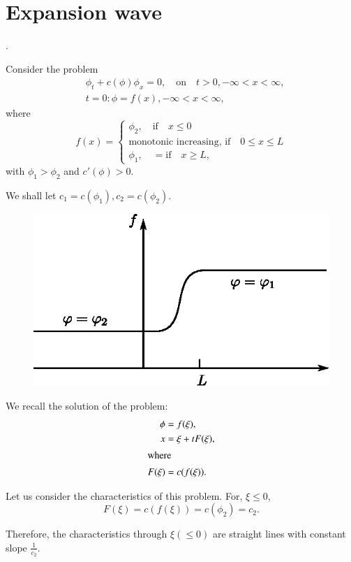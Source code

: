 \section{Expansion wave}.\label{chap1:sec1.3}

Consider the problem
\begin{align*}
&\phi_t+c(\phi)\phi_x=0,\quad\text{on}\quad t>0, -\infty < x < \infty,\\
& t=0:\phi =f(x), -\infty < x< \infty,
\end{align*}
where
\begin{equation*}
f(x)=
\begin{cases}
\phi_2, \quad\text{if}\quad x\leq 0\\
\text{monotonic increasing, if}\quad 0\leq x\leq L\\
\phi_1,\quad=\text{if}\quad x\geq L,
\end{cases}
\end{equation*}
with $\phi_1>\phi_2$ and $c'(\phi)>0$.

We shall let $c_1=c(\phi_1), c_2=c(\phi_2)$.
\begin{figure}[H]
\centering
\includegraphics{figures/fig61-1.2.eps}
\caption{}
\label{chap1:fig1.2}
\end{figure}\pageoriginale

We recall the solution of the problem:
\begin{align*}
\phi &= f(\xi),\\
x&=\xi + tF(\xi),\\
\intertext{where}
F(\xi) &= c(f(\xi)).
\end{align*}

Let us consider the characteristics of this problem. For, $\xi\leq 0$,
$$
F(\xi)=c(f(\xi))=c(\phi_2)=c_2.
$$

Therefore, the characteristics through $\xi(\leq 0)$ are straight lines with constant slope $\frac{1}{c_2}$.

